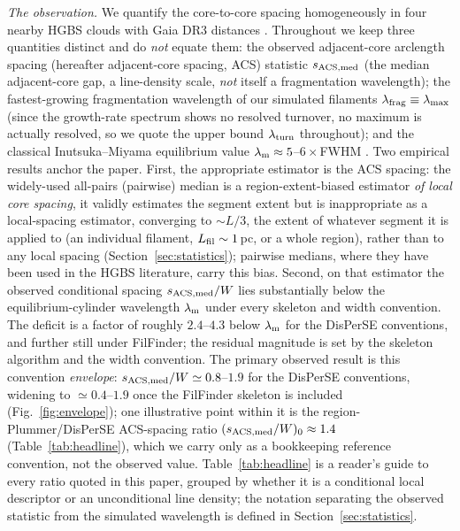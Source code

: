 \documentclass[usenatbib,twoside,twocolumn]{mnras}
\begin{document}
\emph{The observation.} We quantify the core-to-core spacing homogeneously in four nearby HGBS clouds with Gaia DR3 distances \citep{Zhang2023}. Throughout we keep three quantities distinct and do \emph{not} equate them: the observed adjacent-core arclength spacing (hereafter adjacent-core spacing, ACS) statistic $s_{\rm ACS,med}$ (the median adjacent-core gap, a line-density scale, \emph{not} itself a fragmentation wavelength); the fastest-growing fragmentation wavelength of our simulated filaments $\lambda_{\rm frag}\equiv\lambda_{\rm max}$ (since the growth-rate spectrum shows no resolved turnover, no maximum is actually resolved, so we quote the upper bound $\lambda_{\rm turn}$ throughout); and the classical Inutsuka--Miyama equilibrium value $\lambda_{\rm m}\approx5$--$6\times$FWHM \citep{Inutsuka1992,Fischera2012}. Two empirical results anchor the paper. First, the appropriate estimator is the ACS spacing: the widely-used all-pairs (pairwise) median is a region-extent-biased estimator \emph{of local core spacing}, it validly estimates the segment extent but is inappropriate as a local-spacing estimator, converging to $\sim L/3$, the extent of whatever segment it is applied to (an individual filament, $L_{\rm fil}\sim1$\,pc, or a whole region), rather than to any local spacing (Section~\ref{sec:statistics}); pairwise medians, where they have been used in the HGBS literature, carry this bias. Second, on that estimator the observed conditional spacing $s_{\rm ACS,med}/W$ lies substantially below the equilibrium-cylinder wavelength $\lambda_{\rm m}$ under every skeleton and width convention. The deficit is a factor of roughly $2.4$--$4.3$ below $\lambda_{\rm m}$ for the DisPerSE conventions, and further still under FilFinder; the residual magnitude is set by the skeleton algorithm and the width convention. The primary observed result is this convention \emph{envelope}: $s_{\rm ACS,med}/W\simeq0.8$--$1.9$ for the DisPerSE conventions, widening to $\simeq0.4$--$1.9$ once the FilFinder skeleton is included (Fig.~\ref{fig:envelope}); one illustrative point within it is the region-Plummer/DisPerSE ACS-spacing ratio $(s_{\rm ACS,med}/W)_0\approx1.4$ (Table~\ref{tab:headline}), which we carry only as a bookkeeping reference convention, not the observed value. Table~\ref{tab:headline} is a reader's guide to every ratio quoted in this paper, grouped by whether it is a conditional local descriptor or an unconditional line density; the notation separating the observed statistic from the simulated wavelength is defined in Section~\ref{sec:statistics}.
\end{document}
